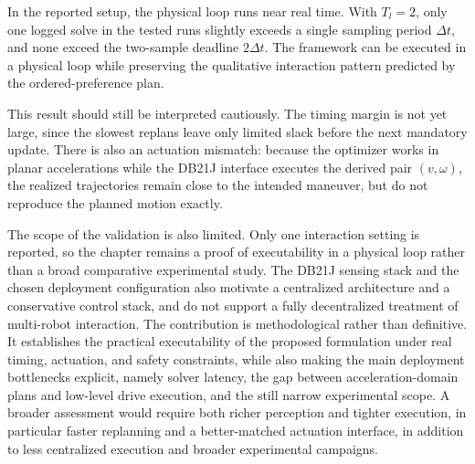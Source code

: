 In the reported setup, the physical loop runs near real time.
With \(T_l = 2\), only one logged solve in the tested runs slightly exceeds a single sampling period
\(\Delta t\), and none exceed the two-sample deadline \(2\Delta t\).
The framework can be executed in a physical loop while preserving the qualitative interaction
pattern predicted by the ordered-preference plan.

This result should still be interpreted cautiously.
The timing margin is not yet large, since the slowest replans leave only limited slack before the next mandatory
update. There is also an actuation mismatch: because the optimizer works in planar accelerations while the
DB21J interface executes the derived pair \((v,\omega)\), the realized trajectories remain close to the intended
maneuver, but do not reproduce the planned motion exactly.

The scope of the validation is also limited.
Only one interaction setting is reported, so the chapter remains a proof of executability in a
physical loop rather than a broad comparative experimental study.
The DB21J sensing stack and the chosen deployment configuration also motivate a centralized
architecture and a conservative control stack, and do not support a fully decentralized treatment
of multi-robot interaction.
The contribution is methodological rather than definitive. It establishes the
practical executability of the proposed formulation under real timing, actuation, and safety constraints, while also making
the main deployment bottlenecks explicit, namely solver latency, the gap between acceleration-domain plans
and low-level drive execution, and the still narrow experimental scope.
A broader assessment would require both richer perception and tighter execution, in particular
faster replanning and a better-matched actuation interface, in addition to less centralized execution and broader
experimental campaigns.
